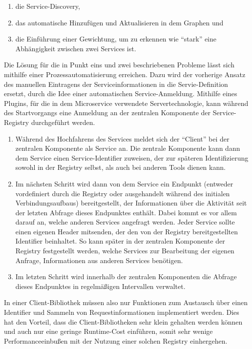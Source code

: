 \begin{enumerate}
	\item die Service-Discovery,
	\item das automatische Hinzufügen und Aktualisieren in dem Graphen und
	\item die Einführung einer Gewichtung, um zu erkennen wie \enquote{stark} eine Abhängigkeit zwischen zwei Services ist.
\end{enumerate}

Die Lösung für die in Punkt eins und zwei beschriebenen Probleme lässt sich mithilfe einer Prozessautomatisierung erreichen. Dazu wird der vorherige Ansatz des manuellen Eintragens der Serviceinformationen in die Servie-Definition ersetzt, durch die Idee einer automatischen Service-Anmeldung. Mithilfe eines Plugins, für die in dem Microservice verwendete Servertechnologie, kann während des Startvorgangs eine Anmeldung an der zentralen Komponente der Service-Registry durchgeführt werden. 
\begin{enumerate}
	\item Während des Hochfahrens des Services meldet sich der \enquote{Client} bei der zentralen Komponente als Service an. Die zentrale Komponente kann dann dem Service einen Service-Identifier zuweisen, der zur späteren Identifizierung sowohl in der Registry selbst, als auch bei anderen Tools dienen kann.
	\item Im nächsten Schritt wird dann von dem Service ein Endpunkt (entweder vordefiniert durch die Registry oder ausgehandelt während des initialen Verbindungsaufbaus) bereitgestellt, der Informationen über die Aktivität seit der letzten Abfrage dieses Endpunktes enthält. Dabei kommt es vor allem darauf an, welche anderen Services angefragt werden. Jeder Service sollte einen eigenen Header mitsenden, der den von der Registry bereitgestellten Identifier beinhaltet. So kann später in der zentralen Komponente der Registry festgestellt werden, welche Services zur Bearbeitung der eigenen Anfrage, Informationen aus anderen Services benötigen.
	\item Im letzten Schritt wird innerhalb der zentralen Komponenten die Abfrage dieses Endpunktes in regelmäßigen Intervallen verwaltet.
\end{enumerate}

In einer Client-Bibliothek müssen also nur Funktionen zum Austausch über einen Identifier und Sammeln von Requestinformationen implementiert werden. Dies hat den Vorteil, dass die Client-Bibliotheken sehr klein gehalten werden können und auch nur eine geringe Runtime-Cost einführen, somit sehr wenige Performanceeinbußen mit der Nutzung einer solchen Registry einhergehen.

